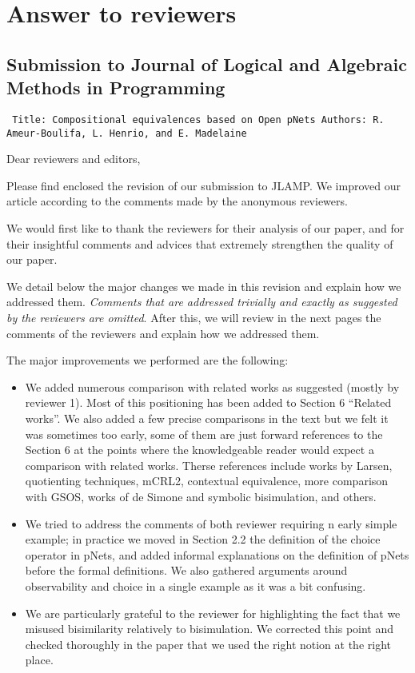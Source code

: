 \documentclass[10pt]{article}
\newenvironment{ttbox}{\begin{alltt}\small\tt}%
                      {\end{alltt}}
\begin{document}
\section*{Answer to reviewers }
\subsection*{Submission to Journal of Logical and Algebraic Methods in Programming}
\medskip
\begin{ttbox}
Title: Compositional equivalences based on Open pNets
Authors: R. Ameur-Boulifa, L. Henrio, and E. Madelaine
\end{ttbox}
\bigskip
Dear reviewers and editors,

Please find enclosed the revision of our submission to JLAMP. We improved our article according to the comments made by the
anonymous reviewers.

We would first like to thank the reviewers for their analysis of our
paper, and for their insightful comments and advices that extremely strengthen the quality of our paper.

We detail below the major changes we made in this revision and explain how we addressed them.  \emph{Comments that are  addressed trivially and exactly as suggested by the reviewers are omitted}.  
After this, we will review in the next pages the comments of the reviewers and explain how we addressed them. 

The major improvements we performed are the following:
\begin{itemize}
\item We added numerous comparison with related works as suggested (mostly by reviewer 1). 
Most of this positioning has been added to Section 6 ``Related works''. 
We also added a few precise comparisons in the text but we felt it was sometimes too  early, some of them are just forward references to the Section 6 at the points where the knowledgeable reader would expect a comparison with related works. Therse references include works by Larsen, quotienting techniques, mCRL2, contextual equivalence, more comparison with GSOS, works of de Simone and symbolic bisimulation, and others.
\item We tried to address the comments of both reviewer requiring n early simple example; in practice we moved in Section  2.2 the definition of the choice operator in pNets, and added informal explanations on the definition of pNets before the formal definitions. We also gathered arguments around observability and choice in a single example as it was a bit confusing.
\item We are particularly grateful to the reviewer for highlighting the fact that we misused bisimilarity relatively to bisimulation. We corrected this point and checked thoroughly in the paper that we used the right notion at the right place.
\end{itemize}
\end{document}
